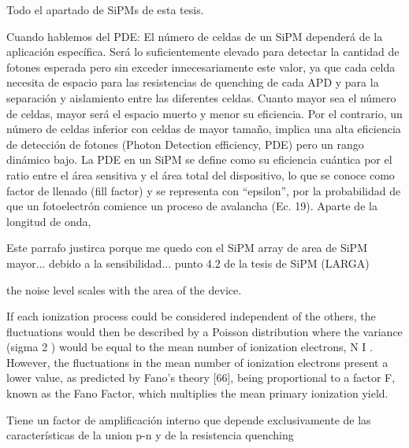 Todo el apartado de SiPMs de esta tesis.

Cuando hablemos del PDE:
El número de celdas de un SiPM dependerá de la aplicación específica. Será lo suficientemente elevado para detectar la cantidad de fotones esperada pero sin exceder innecesariamente este valor, ya que cada celda necesita de espacio para las resistencias de quenching de cada APD y para la separación y aislamiento entre las diferentes celdas. Cuanto mayor sea el número de celdas, mayor será el espacio muerto y menor su eficiencia. Por el contrario, un número de celdas inferior con celdas de mayor tamaño, implica una alta eficiencia de detección de fotones (Photon Detection efficiency, PDE) pero un rango dinámico bajo. La PDE en un SiPM se define como su eficiencia cuántica por el ratio entre el área sensitiva y el área total del dispositivo, lo que se conoce como factor de llenado (fill factor) y se representa con “epsilon”, por la probabilidad de que un fotoelectrón comience un proceso de avalancha (Ec. 19). Aparte de la longitud de onda, 

Este parrafo justirca porque me quedo con el SiPM array de area de SiPM mayor... debido a la sensibilidad... punto 4.2 de la tesis de SiPM (LARGA)



the noise level scales with the area of the device. 




If each ionization process could be considered independent of the others, the fluctuations would then be described by a Poisson distribution where the variance (sigma 2 ) would be equal to the mean number of ionization electrons, N I . However, the fluctuations in the mean number of ionization electrons present a lower value, as predicted by Fano’s theory [66], being proportional to a factor F, known as the Fano Factor, which multiplies the mean primary ionization yield. 


Tiene un factor de amplificación interno que depende exclusivamente de las características de la union p-n y de la resistencia quenching